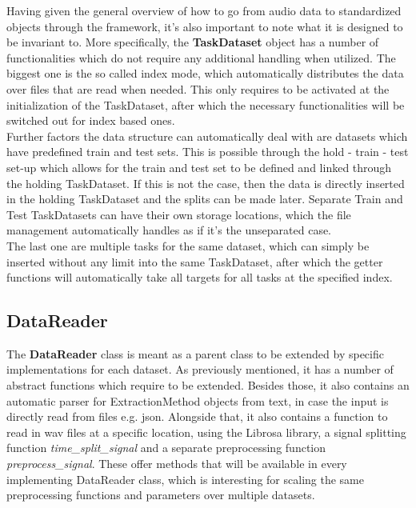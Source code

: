 Having given the general overview of how to go from audio data to standardized objects through the framework, it's also important to note what it is designed to be invariant to. More specifically, the \textbf{TaskDataset} object has a number of functionalities which do not require any additional handling when utilized. The biggest one is the so called index mode, which automatically distributes the data over files that are read when needed. This only requires to be activated at the initialization of the TaskDataset, after which the necessary functionalities will be switched out for index based ones. \\

Further factors the data structure can automatically deal with are datasets which have predefined train and test sets. This is possible through the hold - train - test set-up which allows for the train and test set to be defined and linked through the holding TaskDataset. If this is not the case, then the data is directly inserted in the holding TaskDataset and the splits can be made later. Separate Train and Test TaskDatasets can have their own storage locations, which the file management automatically handles as if it's the unseparated case.\\

The last one are multiple tasks for the same dataset, which can simply be inserted without any limit into the same TaskDataset, after which the getter functions will automatically take all targets for all tasks at the specified index. \\

\subsection{DataReader} \label{Impl:DataRead:DataReader}


The \textbf{DataReader} class is meant as a parent class to be extended by specific implementations for each dataset. As previously mentioned, it has a number of abstract functions which require to be extended. Besides those, it also contains an automatic parser for ExtractionMethod objects from text, in case the input is directly read from files e.g. json. Alongside that, it also contains a function to read in wav files at a specific location, using the Librosa library, a signal splitting function \textit{time\_split\_signal} and a separate preprocessing function \textit{preprocess\_signal}.  These offer methods that will be available in every implementing DataReader class, which is interesting for scaling the same preprocessing functions and parameters over multiple datasets.\\


